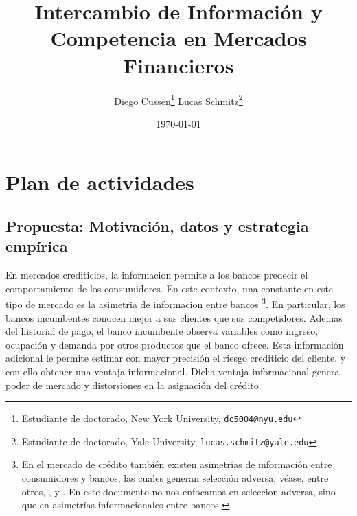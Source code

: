 \documentclass[11pt]{article}
\theoremstyle{plain}
\theoremstyle{plain}
\begin{document}

 
\title{%
{\Large Intercambio de Información y Competencia en Mercados Financieros}}
\author{
Diego Cussen\thanks{Estudiante de doctorado, New York University, \texttt{dc5004@nyu.edu}}
\quad \quad 
Lucas Schmitz\thanks{Estudiante de doctorado, Yale University,  \texttt{lucas.schmitz@yale.edu}}
} 
\date{\today}

\maketitle

\section{Plan de actividades}

\subsection{Propuesta: Motivación, datos y estrategia empírica}


En mercados crediticios, la informacion permite a los bancos predecir el comportamiento de los consumidores. En este contexto, una constante en este tipo de mercado es la asimetria de informacion entre bancos
\footnote{En el mercado de crédito también existen asimetrías de información entre consumidores y bancos, las cuales generan selección adversa; véase, entre otros, \textcite{rothschild_equilibrium_1976}, \textcite{einav_selection_2011} y \textcite{einav_io_2021}. En este documento no nos enfocamos en seleccion adversa, sino que en asimetrías informacionales entre bancos.}.  
En particular, los bancos incumbentes conocen mejor a sus clientes que sus competidores.  Ademas del historial de pago, el banco incumbente observa variables como ingreso, ocupación y demanda por otros productos que el banco ofrece. Esta información adicional le permite estimar con mayor precisión el riesgo crediticio del cliente, y con ello obtener una ventaja informacional. Dicha ventaja informacional genera poder de mercado y distorsiones en la asignación del crédito. 



 
 
\end{document}

